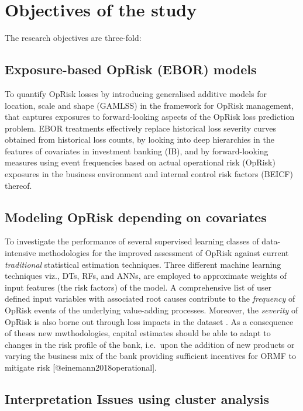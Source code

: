 \documentclass[]{article}
\begin{document}
\section{Objectives of the study}
\label{sec:Objectives of the study}

The research objectives are three-fold:

\subsection{Exposure-based OpRisk (EBOR) models}

To quantify OpRisk losses by introducing generalised additive models for
location, scale and shape (GAMLSS) in the framework for OpRisk
management, that captures exposures to forward-looking aspects of the
OpRisk loss prediction problem. EBOR treatments effectively replace
historical loss severity curves obtained from historical loss counts, by
looking into deep hierarchies in the features of covariates in
investment banking (IB), and by forward-looking measures using event
frequencies based on actual operational risk (OpRisk) exposures in the
business environment and internal control risk factors (BEICF) thereof.

\subsection{Modeling OpRisk depending on covariates}

To investigate the performance of several supervised learning classes of
data-intensive methodologies for the improved assessment of OpRisk
against current \emph{traditional} statistical estimation techniques.
Three different machine learning techniques viz., DTs, RFs, and ANNs,
are employed to approximate weights of input features (the risk factors)
of the model. A comprehensive list of user defined input variables with
associated root causes contribute to the \emph{frequency} of OpRisk
events of the underlying value-adding processes. Moreover, the
\emph{severity} of OpRisk is also borne out through loss impacts in the
dataset . As a consequence of theses new mwthodologies, capital
estimates should be able to adapt to changes in the risk profile of the
bank, i.e.~upon the addition of new products or varying the business mix
of the bank providing sufficient incentives for ORMF to mitigate risk
{[}@einemann2018operational{]}.

\subsection{Interpretation Issues using cluster analysis}
\end{document}
